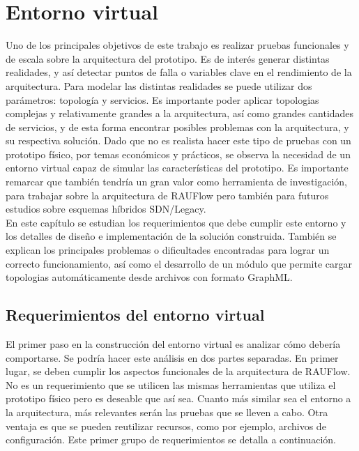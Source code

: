 \chapter{Entorno virtual}

\graphicspath{{Chapter3/Figs/}}

Uno de los principales objetivos de este trabajo es realizar pruebas funcionales y de escala sobre la arquitectura del prototipo. Es de interés generar distintas realidades, y así detectar puntos de falla o variables clave en el rendimiento de la arquitectura. Para modelar las distintas realidades se puede utilizar dos parámetros: topología y servicios. Es importante poder aplicar topologias complejas y relativamente grandes a la arquitectura, así como grandes cantidades de servicios, y de esta forma encontrar posibles problemas con la arquitectura, y su respectiva solución. Dado que no es realista hacer este tipo de pruebas con un prototipo físico, por temas económicos y prácticos, se observa la necesidad de un entorno virtual capaz de simular las características del prototipo. Es importante remarcar que también tendría un gran valor como herramienta de investigación, para trabajar sobre la arquitectura de RAUFlow pero también para futuros estudios sobre esquemas híbridos SDN/Legacy. \\
En este capítulo se estudian los requerimientos que debe cumplir este entorno y los detalles de diseño e implementación de la solución construida. También se explican los principales problemas o dificultades encontradas para lograr un correcto funcionamiento, así como el desarrollo de un módulo que permite cargar topologias automáticamente desde archivos con formato GraphML.

\section{Requerimientos del entorno virtual}
El primer paso en la construcción del entorno virtual es analizar cómo debería comportarse. Se podría hacer este análisis en dos partes separadas. En primer lugar, se deben cumplir los aspectos funcionales de la arquitectura de RAUFlow. No es un requerimiento que se utilicen las mismas herramientas que utiliza el prototipo físico pero es deseable que así sea. Cuanto más similar sea el entorno a la arquitectura, más relevantes serán las pruebas que se lleven a cabo. Otra ventaja es que se pueden reutilizar recursos, como por ejemplo, archivos de configuración. Este primer grupo de requerimientos se detalla a continuación.

